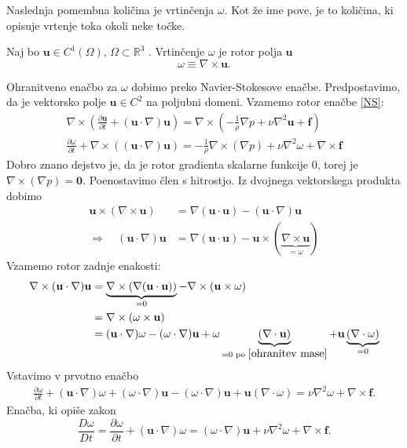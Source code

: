 \documentclass[mat2, tisk]{fmfdelo}
\newcommand{\R}{\mathbb R}
\newcommand{\bd}{\textbf}
\begin{document}
Naslednja pomembna količina je vrtinčenja \bd{$\omega$}. Kot že ime pove, je to količina, ki opisuje vrtenje toka okoli neke točke. 
\begin{definicija}
Naj bo $\bd{u} \in C^1(\Omega)$, $\Omega \subset \R^3$ . Vrtinčenje $\omega$ je rotor polja $\bd{u}$
\begin{equation}
\bd{$\omega$} \equiv \nabla \times \bd{u}.
\end{equation}
\end{definicija}
Ohranitveno enačbo za \bd{$\omega$} dobimo preko Navier-Stokesove enačbe. Predpostavimo, 
da je vektorsko polje $\bd{u} \in C^2$ na poljubni domeni. Vzamemo rotor enačbe \eqref{NS}:
\begin{align*}
\nabla \times (\frac{\partial \bd{u}}{\partial t} + (\bd{u}\cdot \nabla)\bd{u}) = \nabla\times (- \frac{1}{\rho}\nabla p + \nu \nabla^2 \bd{u} + \bd{f}) \\
\frac{\partial \bd{$\omega$}}{\partial t} + \nabla \times ((\bd{u}\cdot \nabla)\bd{u}) = - \frac{1}{\rho} \nabla \times (\nabla p) + \nu\nabla^2 \bd{$\omega$} + \nabla \times \bd{f}
\end{align*}
Dobro znano dejstvo je, da je rotor gradienta skalarne funkcije $0$, torej je 
$\nabla \times (\nabla p) = \bd{0}$. Poenostavimo člen s hitrostjo. Iz dvojnega vektorskega produkta dobimo 
\begin{align*}
\bd{u} \times (\nabla \times \bd{u}) &=  \nabla(\bd{u}\cdot \bd{u}) - (\bd{u}\cdot \nabla)\bd{u} \\
\Longrightarrow \quad(\bd{u}\cdot \nabla)\bd{u} &= \nabla (\bd{u}\cdot \bd{u}) - \bd{u}\times (\underbrace{\nabla \times \bd{u}}_{= \bd{$\omega$}})
\end{align*}
Vzamemo rotor zadnje enakosti:
\begin{align*}
\nabla \times (\bd{u}\cdot \nabla)\bd{u} &= \underbrace{\nabla \times (\nabla(\bd{u}\cdot \bd{u}))}_{= 0} - \nabla \times (\bd{u} \times \bd{$\omega$}) \\
&= \nabla \times (\bd{$\omega$} \times \bd{u}) \\
&= (\bd{u}\cdot \nabla)\bd{$\omega$} - (\bd{$\omega$} \cdot \nabla)\bd{u} + \bd{$\omega$}\underbrace{(\nabla \cdot \bd{u})}_{= 0 \text{ po } \eqref{ohranitev mase}} + \bd{u} \underbrace{(\nabla \cdot \bd{$\omega$})}_{= 0}
\end{align*}
Vstavimo v prvotno enačbo
\begin{align*}
\frac{\partial \bd{$\omega$}}{\partial t} + (\bd{u}\cdot \nabla)\bd{$\omega$} + (\bd{$\omega$} \cdot \nabla)\bd{u} - (\bd{$\omega$} \cdot \nabla)\bd{u} + \bd{u} (\nabla \cdot \bd{$\omega$}) =  \nu\nabla^2 \bd{$\omega$} + \nabla \times \bd{f}.
\end{align*}
Enačba, ki opiše zakon
\begin{equation}
\frac{D\bd{$\omega$}}{D t} = \frac{\partial \bd{$\omega$}}{\partial t} + (\bd{u}\cdot \nabla)\bd{$\omega$} = (\bd{$\omega$} \cdot \nabla)\bd{u}+ \nu \nabla^2 \bd{$\omega$} + \nabla \times \bd{f}.
\end{equation}
\end{document}

